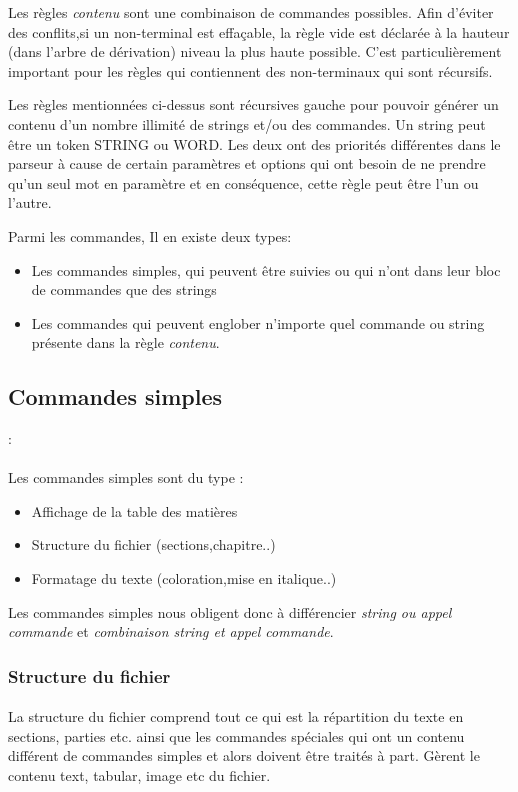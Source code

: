 \documentclass{report}
\begin{document}
{{{Les règles \textit{contenu} sont une combinaison de commandes possibles. Afin d'éviter des conflits,si un non-terminal est effaçable, la règle vide est déclarée à la hauteur (dans l'arbre de dérivation) niveau la plus haute possible. C'est particulièrement important pour les règles qui contiennent des non-terminaux qui sont récursifs.

 Les règles mentionnées ci-dessus sont récursives gauche pour pouvoir générer un contenu d'un nombre illimité de strings et/ou des commandes. Un string peut être un token STRING ou WORD. Les deux ont des priorités différentes dans le parseur à cause de certain paramètres et options qui ont besoin de ne prendre qu'un seul mot en paramètre et en conséquence, cette règle peut être l'un ou l'autre.

Parmi les commandes, Il en existe deux types: 
\begin{itemize}
\item Les commandes simples, qui peuvent être suivies ou qui n'ont dans leur bloc de commandes que des strings 
\item Les commandes qui peuvent englober n'importe quel commande ou string présente dans la règle \textit{contenu}.
\end{itemize}
}
\subsection{Commandes simples}:{
\paragraph{}{
Les commandes simples sont du type :
 \begin{itemize}
 \item Affichage de la table des matières
 \item Structure du fichier (sections,chapitre..)
 \item Formatage du texte (coloration,mise en italique..)
\end{itemize} 
Les commandes simples nous obligent donc à différencier
 \textit{string ou appel commande} et 
 \textit{combinaison string et appel commande}.
}
\subsubsection{Structure du fichier}{
\paragraph{}{
La structure du fichier comprend tout ce qui est la répartition du texte en sections, parties etc. ainsi que les commandes spéciales qui ont un contenu différent de commandes simples et alors doivent être traités à part.
Gèrent le contenu text, tabular, image etc du fichier.
}
}
}
}}
\end{document}
